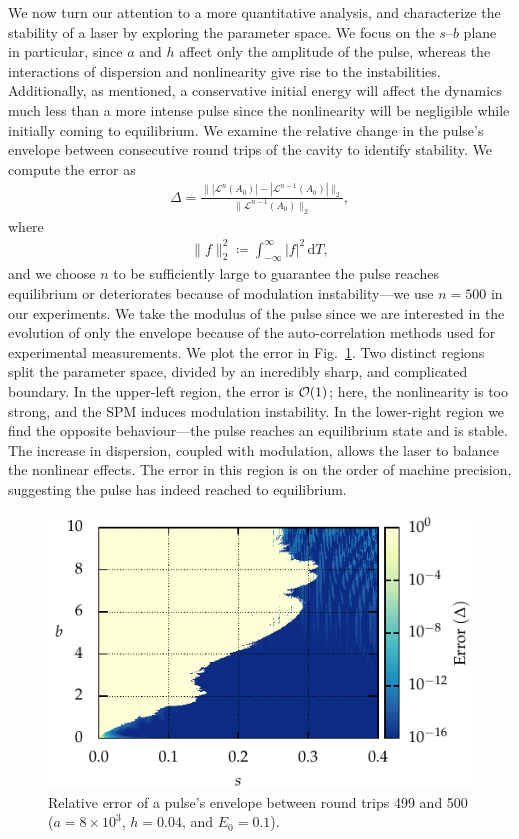 \documentclass[9pt,twocolumn,twoside]{osajnl}
\let\originalleft\left
\let\originalright\right
\renewcommand{\left}{\mathopen{}\mathclose\bgroup\originalleft}
\renewcommand{\right}{\aftergroup\egroup\originalright}
\providecommand{\df}{\textrm{d}} %
\providecommand{\bigO}[1]{\ensuremath{\mathop{}\mathopen{}\mathcal{O}\mathopen{}\left(#1\right)}} %
\begin{document}
We now turn our attention to a more quantitative analysis, and characterize the stability of a laser by exploring the parameter space. We focus on the $s$--$b$ plane in particular, since $a$ and $h$ affect only the amplitude of the pulse, whereas the interactions of dispersion and nonlinearity give rise to the instabilities. Additionally, as mentioned, a conservative initial energy will affect the dynamics much less than a more intense pulse since the nonlinearity will be negligible while initially coming to equilibrium. We examine the relative change in the pulse's envelope between consecutive round trips of the cavity to identify stability. We compute the error as
\begin{align}
	\Delta = \frac{\| |\mathcal{L}^n(A_0)| - |\mathcal{L}^{n-1}(A_0)| \|_2}{\| \mathcal{L}^{n-1}(A_0) \|_2},
	\label{eq:error}
\end{align}
where
\begin{align}
	\| f \|_2^2 \coloneqq \int_{-\infty}^\infty |f|^2 \, \df T,
\end{align}
and we choose $n$ to be sufficiently large to guarantee the pulse reaches equilibrium or deteriorates because of modulation instability---we use $n = 500$ in our experiments. We take the modulus of the pulse since we are interested in the evolution of only the envelope because of the auto-correlation methods used for experimental measurements. We plot the error in Fig.~\ref{fig:error}. Two distinct regions split the parameter space, divided by an incredibly sharp, and complicated boundary. In the upper-left region, the error is $\bigO{1}$; here, the nonlinearity is too strong, and the SPM induces modulation instability. In the lower-right region we find the opposite behaviour---the pulse reaches an equilibrium state and is stable. The increase in dispersion, coupled with modulation, allows the laser to balance the nonlinear effects. The error in this region is on the order of machine precision, suggesting the pulse has indeed reached to equilibrium.

\begin{figure}[tbp]
	\centering
	\includegraphics{Figures/ParamSpaceErr}
	\caption{Relative error of a pulse's envelope between round trips 499 and 500 ($a = 8 \times 10^3$, $h = 0.04$, and $E_0 = 0.1$).}
	\label{fig:error}
\end{figure}
\end{document}
